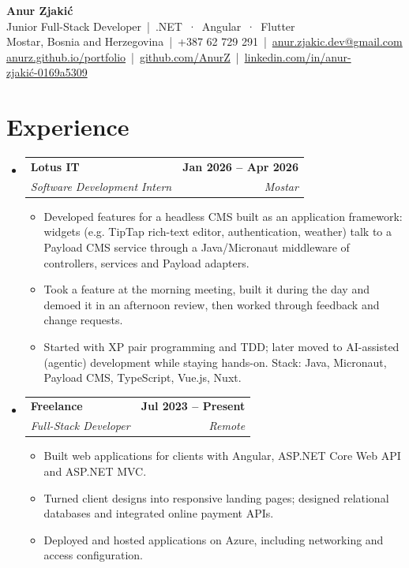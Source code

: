 \documentclass[a4paper,10.5pt]{article}
\makeatletter
\newcommand{\cvitem}[1]{\item\small{#1\vspace{-1pt}}}
\newcommand{\cvheading}[4]{
  \vspace{-1pt}\item
  \begin{tabular*}{\linewidth}[t]{l@{\extracolsep{\fill}}r}
    \textbf{#1} & \textbf{#2} \\
    \textit{\small#3} & \textit{\small #4} \\
  \end{tabular*}\vspace{-6pt}
}
\newcommand{\liststart}{\begin{itemize}[leftmargin=0.15in, label={}]}
\newcommand{\listend}{\end{itemize}}
\newcommand{\bulletstart}{\begin{itemize}[leftmargin=0.2in, itemsep=1pt]}
\newcommand{\bulletend}{\end{itemize}\vspace{-4pt}}
\makeatother
\begin{document}
\begin{center}
  {\Huge \bfseries Anur Zjakić} \\ \vspace{2pt}
  {\large Junior Full-Stack Developer \,|\, .NET \,·\, Angular \,·\, Flutter} \\ \vspace{4pt}
  \small Mostar, Bosnia and Herzegovina \,|\, +387 62 729 291 \,|\,
  \href{mailto:anur.zjakic.dev@gmail.com}{anur.zjakic.dev@gmail.com} \\ \vspace{1pt}
  \href{https://anurz.github.io/portfolio/}{anurz.github.io/portfolio} \,|\,
  \href{https://github.com/AnurZ}{github.com/AnurZ} \,|\,
  \href{https://www.linkedin.com/in/anur-zjaki%C4%87-0169a5309}{linkedin.com/in/anur-zjakić-0169a5309}
\end{center}
\vspace{-6pt}

\section{Experience}
\liststart
  \cvheading{Lotus IT}{Jan 2026 -- Apr 2026}{Software Development Intern}{Mostar}
  \bulletstart
    \cvitem{Developed features for a headless CMS built as an application framework: widgets (e.g. TipTap rich-text editor, authentication, weather) talk to a Payload CMS service through a Java/Micronaut middleware of controllers, services and Payload adapters.}
    \cvitem{Took a feature at the morning meeting, built it during the day and demoed it in an afternoon review, then worked through feedback and change requests.}
    \cvitem{Started with XP pair programming and TDD; later moved to AI-assisted (agentic) development while staying hands-on. Stack: Java, Micronaut, Payload CMS, TypeScript, Vue.js, Nuxt.}
  \bulletend

  \cvheading{Freelance}{Jul 2023 -- Present}{Full-Stack Developer}{Remote}
  \bulletstart
    \cvitem{Built web applications for clients with Angular, ASP.NET Core Web API and ASP.NET MVC.}
    \cvitem{Turned client designs into responsive landing pages; designed relational databases and integrated online payment APIs.}
    \cvitem{Deployed and hosted applications on Azure, including networking and access configuration.}
  \bulletend
\listend

\end{document}
